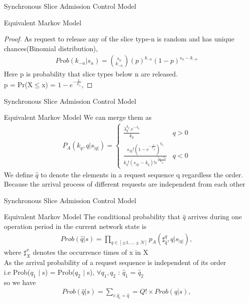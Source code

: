 \documentclass{beamer}
\begin{document}
\begin{frame}{Synchronous Slice Admission Control Model}
\begin{block}{Equivalent Markov Model}
 \begin{proof}
 As request to release any of the  slice type-n is random and has unique chances(Binomial distribution), \\
 \begin{align}
 Prob(k_{-n} |s_{n})= {s_{n}\choose k_{-n}}          (p)^{k_{-n}}(1-p)^{s_{n}-k_{-n}}
 \end{align}
Here p is probability that slice types below n are released.\\
p = Pr(X$\le$x) = $1-e^{-\frac{1}{\mu_{n}}}$,  
 \end{proof}
\end{block}
\end{frame}

\begin{frame}{Synchronous Slice Admission Control Model}
\begin{block}{Equivalent Markov Model}
 We can merge them as \\
 \begin{align}
 P_{A}(k_{q},q | s_{|q|}) = 
     \begin{cases}
      \frac{\lambda_{q}^{k_{q}}. e^{-\lambda_{q}}}{k_{q}\!}  &  q>0\\
      \frac {s_{|q|}!(1- e^{-\frac{1}{\mu_{|q|}}})^{k_{q}}}{k_{q}!(s_{|q|}-k_{q})!e^{\frac{s_{|q|}-k_q}{\mu_{|q|}}  }}  & q<0
\end{cases}
 \end{align}
 We define $\hat{q}$ to denote the elements in a request sequence q regardless the order. Because the arrival process of different requests are independent from each other\\
\end{block}
\end{frame}

\begin{frame}{Synchronous Slice Admission Control Model}
\begin{block}{Equivalent Markov Model}
 The conditional probability that $\hat{q}$ arrives during one operation period in the current network state is \\
\begin{align}
 Prob(\hat{q}|s) = \prod_{q\in [\pm 1,...\pm N]}p_{A}(\sharp_{\hat{q}}^{q},q |s_{|q|}),
\end{align}
 where  $\sharp_{X}^{x}$ denotes the occurrence times of x in X\\
 As the arrival probability of a request sequence is independent of its order\\
 i.e Prob($q_{1}$ $|$ s) = Prob($q_{2}$ $|$ s), $\forall${$q_{1},q_{2}$} : $\hat q_{1}$ = $\hat q_{2}$\\
 so we have \\
 \begin{align}
Prob(\hat{q} | s) = \sum_{i:\hat{q}_{i}=\hat{q}} = Q!\times Prob(q|s),  
 \end{align}
\end{block}
\end{frame}
\end{document}
